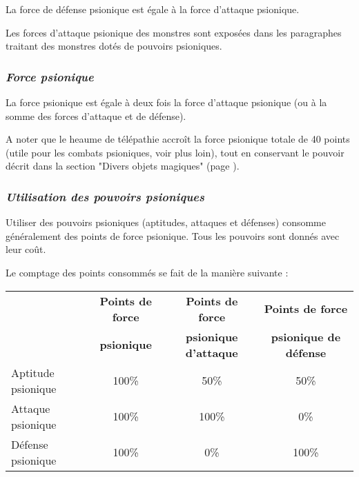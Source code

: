 \bigskip

La force de défense psionique est égale à la force d'attaque psionique.

\bigskip

Les forces d'attaque psionique des monstres sont exposées dans les paragraphes traitant des monstres dotés de pouvoirs psioniques.

\subsubsection*{\textit{Force psionique}}

La force psionique est égale à deux fois la force d'attaque psionique (ou à la somme des forces d'attaque et de défense).

\bigskip

A noter que le heaume de télépathie accroît la force psionique totale de 40 points (utile pour les combats psioniques, voir plus loin), tout en conservant le pouvoir décrit dans la section "Divers objets magiques" (page \pageref{objet-heaume-telepathie}).


\subsubsection*{\textit{Utilisation des pouvoirs psioniques}}
\label{custom-utilisation-pouvoirs}

Utiliser des pouvoirs psioniques (aptitudes, attaques et défenses) consomme généralement des points de force psionique. Tous les pouvoirs sont donnés avec leur coût.

\bigskip

Le comptage des points consommés se fait de la manière suivante :

\bigskip

\begin{tabular}{lccc}
& \textbf{Points de force} & \textbf{Points de force} & \textbf{Points de force} \\
& \textbf{psionique} & \textbf{psionique d'attaque} & \textbf{psionique de défense} \\
Aptitude psionique & 100\%  & 50\%  & 50\%  \\
Attaque psionique & 100\%   & 100\% & 0\% \\
Défense psionique & 100\%   & 0\%   & 100\% \\
\end{tabular}

